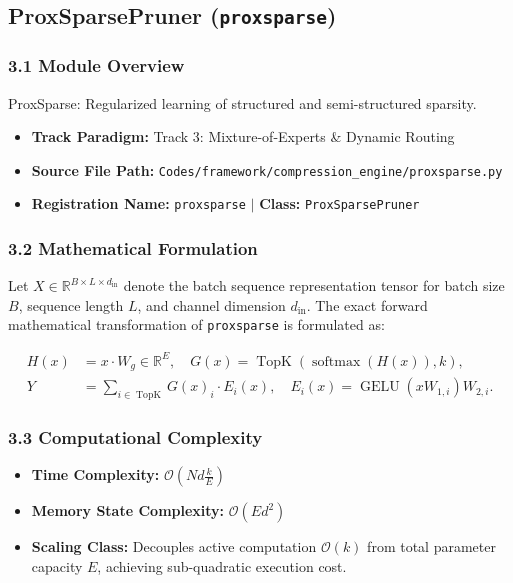 \subsection{ProxSparsePruner (\texttt{proxsparse})}
\label{sec:app_module_proxsparse}

\subsubsection*{3.1 Module Overview}
ProxSparse: Regularized learning of structured and semi-structured sparsity.
\begin{itemize}
    \item \textbf{Track Paradigm:} Track 3: Mixture-of-Experts & Dynamic Routing
    \item \textbf{Source File Path:} \texttt{Codes/framework/compression\_engine/proxsparse.py}
    \item \textbf{Registration Name:} \texttt{proxsparse} $\mid$ \textbf{Class:} \texttt{ProxSparsePruner}
\end{itemize}

\subsubsection*{3.2 Mathematical Formulation}
Let $X \in \mathbb{R}^{B \times L \times d_{\text{in}}}$ denote the batch sequence representation tensor for batch size $B$, sequence length $L$, and channel dimension $d_{\text{in}}$. The exact forward mathematical transformation of \texttt{proxsparse} is formulated as:

\begin{align}
H(x) &= x \cdot W_g \in \mathbb{R}^{E}, \quad G(x) = \operatorname{TopK}\left(\operatorname{softmax}(H(x)), k\right), \\
Y &= \sum_{i \in \operatorname{TopK}} G(x)_i \cdot E_i(x), \quad E_i(x) = \operatorname{GELU}(x W_{1, i}) W_{2, i}.
\end{align}


\subsubsection*{3.3 Computational Complexity}
\begin{itemize}
    \item \textbf{Time Complexity:} $\mathcal{O}(N d \frac{k}{E})$
    \item \textbf{Memory State Complexity:} $\mathcal{O}(E d^2)$
    \item \textbf{Scaling Class:} Decouples active computation $\mathcal{O}(k)$ from total parameter capacity $E$, achieving sub-quadratic execution cost.
\end{itemize}

